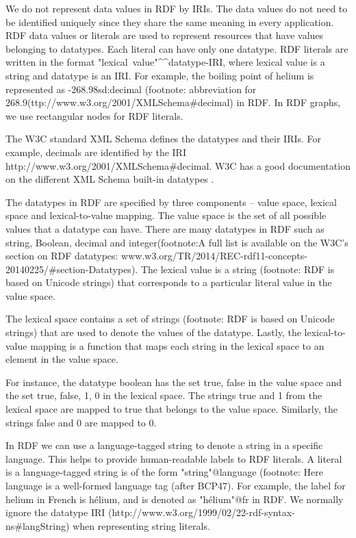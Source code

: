 We do not represent data values in RDF by IRIs. The data values do not need to be identified uniquely since they share the same meaning in every application. RDF data values or literals are used to represent resources that have values belonging to datatypes. Each literal can have only one datatype. RDF literals are written in the format "lexical~value"{\textasciicircum\textasciicircum}datatype-IRI, where lexical value is a string and datatype is an IRI. For example, the boiling point of helium is represented as -268.9^^xsd:decimal (footnote: abbreviation for 268.9^^http://www.w3.org/2001/XMLSchema\#decimal) in RDF. In RDF graphs, we use rectangular nodes for RDF literals.

The W3C standard XML Schema defines the datatypes and their IRIs. For example, decimals are identified by the IRI http://www.w3.org/2001/XMLSchema\#decimal. W3C has a good documentation on the different XML Schema built-in datatypes \cite{R.Cyganiak2014}. 

The datatypes in RDF are specified by three components – value space, lexical space and lexical-to-value mapping. The value space is the set of all possible values that a datatype can have. There are many datatypes in RDF such as string, Boolean, decimal and integer(footnote:A full list is available on the W3C’s section on RDF datatypes: www.w3.org/TR/2014/REC-rdf11-concepts-20140225/\#section-Datatypes). The lexical value is a string (footnote: RDF is based on Unicode strings) that corresponds to a particular literal value in the value space.

The lexical space contains a set of strings (footnote: RDF is based on Unicode strings) that are used to denote the values of the datatype. Lastly, the lexical-to-value mapping is a function that maps each string in the lexical space to an element in the value space. 

For instance, the datatype boolean has the set {true, false} in the value space and the set {true, false, 1, 0} in the lexical space. The strings true and 1 from the lexical space are mapped to true that belongs to the value space. Similarly, the strings false and 0 are mapped to 0. 

In RDF we can use a language-tagged string to denote a string in a specific language. This helps to provide human-readable labels to RDF literals. A literal is a language-tagged string is of the form "string"@language (footnote: Here language is a well-formed language tag (after BCP47). For example, the label for helium in French is hélium, and is denoted as "hélium"@fr in RDF. We normally ignore the datatype IRI (http://www.w3.org/1999/02/22-rdf-syntax-ns\#langString) when representing string literals. 


